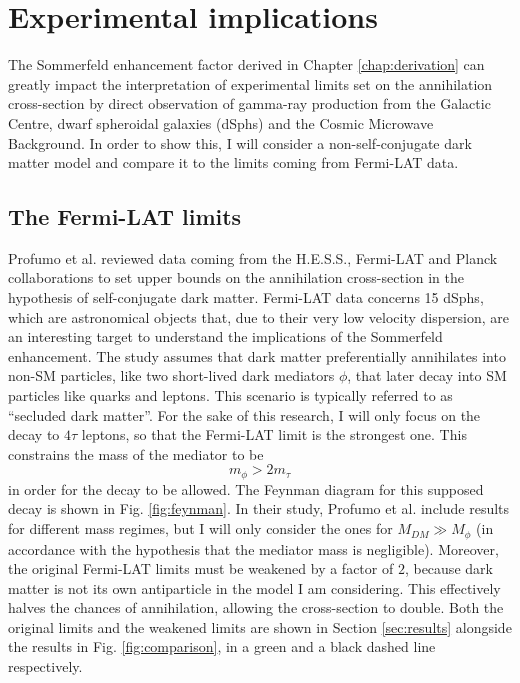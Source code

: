 \chapter{Experimental implications}

The Sommerfeld enhancement factor derived in Chapter \ref{chap:derivation} can greatly impact the interpretation of experimental limits set on the annihilation cross-section by direct observation of gamma-ray production from the Galactic Centre, dwarf spheroidal galaxies (dSphs) and the Cosmic Microwave Background. In order to show this, I will consider a non-self-conjugate dark matter model and compare it to the limits coming from Fermi-LAT data.

\section{The Fermi-LAT limits}

Profumo et al. \cite{Profumo_2018} reviewed data coming from the H.E.S.S., Fermi-LAT and Planck collaborations to set upper bounds on the annihilation cross-section in the hypothesis of self-conjugate dark matter. Fermi-LAT data concerns 15 dSphs, which are astronomical objects that, due to their very low velocity dispersion, are an interesting target to understand the implications of the Sommerfeld enhancement. The study assumes that dark matter preferentially annihilates into non-SM particles, like two short-lived dark mediators \(\phi \), that later decay into SM particles like quarks and leptons. This scenario is typically referred to as ``secluded dark matter''. For the sake of this research, I will only focus on the decay to \(4\tau \) leptons, so that the Fermi-LAT limit is the strongest one. This constrains the mass of the mediator to be
\begin{equation}\label{eq:mediator_mass}
	m_{\phi }  > 2 m_{\tau } 
\end{equation}
in order for the decay to be allowed. The Feynman diagram for this supposed decay is shown in Fig. \ref{fig:feynman}.
In their study, Profumo et al. include results for different mass regimes, but I will only consider the ones for \(M_{DM} \gg M_{\phi } \) (in accordance with the hypothesis that the mediator mass is negligible). Moreover, the original Fermi-LAT limits must be weakened by a factor of \(2\), because dark matter is not its own antiparticle in the model I am considering.
This effectively halves the chances of annihilation, allowing the cross-section to double.
Both the original limits and the weakened limits are shown in Section \ref{sec:results} alongside the results in Fig. \ref{fig:comparison}, in a green and a black dashed line respectively.


